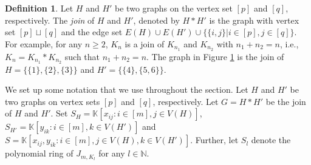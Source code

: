 \documentclass[12pt,reqno]{amsart}
\newcommand \K{\mathbb{K}}
\theoremstyle{plain}
\theoremstyle{definition}
\newtheorem{definition}[theorem]{Definition}
\begin{document}
\begin{definition}\label{def: join of graphs}
Let $H$ and $H'$ be two graphs on the vertex set $[p]$ and $[q]$, respectively. The \emph{join} of $H$ and $H'$, denoted by $H*H'$ is the graph with vertex set $[p]\sqcup[q]$ and the edge set $E(H)\cup E(H')\cup \{\{i,j\}|i\in[p],j\in[q]\}$. For example, for any $n\geq 2$, $K_n$ is a join of $K_{n_1}$ and $K_{n_2}$ with $n_1+n_2=n$, i.e., $K_n=K_{n_1}*K_{n_2}$ such that $n_1+n_2=n$. The graph in Figure \ref{fig: join of graphs} is the join of $H=\{\{1\},\{2\},\{3\}\}$ and $H'=\{\{4\},\{5,6\}\}$.
\end{definition}
\begin{figure}[H]
\centering
{}
\caption{} \label{fig: join of graphs}
\end{figure}

We set up some notation that we use throughout the section. Let $H$ and $H'$ be two graphs on vertex sets $[p]$ and $[q]$, respectively. Let $G=H*H'$ be the join of $H$ and $H'$. Set $S_H=\K[x_{ij}:i\in [m], j\in V(H)]$, $S_{H'}=\K[y_{ik}:i\in[m], k\in V(H')]$ and $S=\K[x_{ij},y_{ik}:i\in [m], j\in V(H),k\in V(H')]$. Further, let $S_l$ denote the polynomial ring of $J_{m,K_{l}}$ for any $l\in \mathbb N$. 
\end{document}
